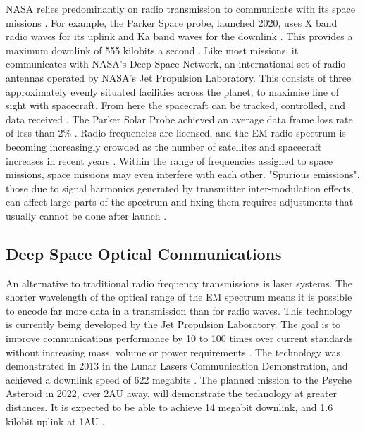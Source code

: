 \documentclass[12pt]{article}
\begin{document}
NASA relies predominantly on radio transmission to communicate with its space missions \cite{nasaradio}. For example, the Parker Space probe, launched 2020, uses X band radio waves for its uplink and Ka band waves for the downlink \cite{parkerbands}. This provides a maximum downlink of 555 kilobits a second \cite{parkerpresskit}. Like most missions, it communicates with NASA's Deep Space Network, an international set of radio antennas operated by NASA's Jet Propulsion Laboratory. This consists of three approximately evenly situated facilities across the planet, to maximise line of sight with spacecraft. From here the spacecraft can be tracked, controlled, and data received \cite{dsnnasa}. The Parker Solar Probe achieved an average data frame loss rate of less than 2\% \cite{parkerkaoperations}. Radio frequencies are licensed, and the EM radio spectrum is becoming increasingly crowded as the number of satellites and spacecraft increases in recent years \cite{emcrowding}. Within the range of frequencies assigned to space missions, space missions may even interfere with each other. "Spurious emissions", those due to signal harmonics generated by transmitter inter-modulation effects, can affect large parts of the spectrum and fixing them requires adjustments that usually cannot be done after launch \cite{handbook}.

\subsection{Deep Space Optical Communications}

An alternative to traditional radio frequency transmissions is laser systems. The shorter wavelength of the optical range of the EM spectrum means it is possible to encode far more data in a transmission than for radio waves. This technology is currently being developed by the Jet Propulsion Laboratory. The goal is to improve communications performance by 10 to 100 times over current standards without increasing mass, volume or power requirements \cite{dsoc}. The technology was demonstrated in 2013 in the Lunar Lasers Communication Demonstration, and achieved a downlink speed of 622 megabits \cite{llcd}. The planned mission to the Psyche Asteroid in 2022, over 2AU away, will demonstrate the technology at greater distances. It is expected to be able to achieve 14 megabit downlink, and 1.6 kilobit uplink at 1AU \cite{dsocpysche}.

\vspace{\baselineskip}
\end{document}
